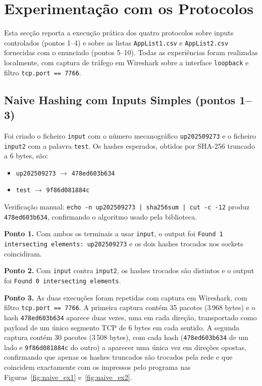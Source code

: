\clearpage
\section{Experimentação com os Protocolos}
\label{sec:step2}

Esta secção reporta a execução prática dos quatro protocolos sobre inputs controlados (pontos 1--4) e sobre as listas \texttt{AppList1.csv} e \texttt{AppList2.csv} fornecidas com o enunciado (pontos 5--10). Todas as experiências foram realizadas localmente, com captura de tráfego em Wireshark sobre a interface \texttt{loopback} e filtro \texttt{tcp.port == 7766}.

\subsection{Naive Hashing com Inputs Simples (pontos 1--3)}
\label{sec:naive_simples}

Foi criado o ficheiro \texttt{input} com o número mecanográfico \texttt{up202509273} e o ficheiro \texttt{input2} com a palavra \texttt{test}. Os hashes esperados, obtidos por SHA-256 truncado a 6 bytes, são:

\begin{itemize}
  \item \texttt{up202509273} $\rightarrow$ \texttt{478ed603b634}
  \item \texttt{test} $\rightarrow$ \texttt{9f86d081884c}
\end{itemize}

Verificação manual: \texttt{echo -n up202509273 | sha256sum | cut -c -12} produz \texttt{478ed603b634}, confirmando o algoritmo usado pela biblioteca.

\textbf{Ponto 1.} Com ambos os terminais a usar \texttt{input}, o output foi \texttt{Found 1 intersecting elements: up202509273} e os dois hashes trocados nos sockets coincidiram.

\textbf{Ponto 2.} Com \texttt{input} contra \texttt{input2}, os hashes trocados são distintos e o output foi \texttt{Found 0 intersecting elements}.

\textbf{Ponto 3.} As duas execuções foram repetidas com captura em Wireshark, com filtro \texttt{tcp.port == 7766}. A primeira captura contém 35 pacotes (3\,968 bytes) e o hash \texttt{478ed603b634} aparece duas vezes, uma em cada direção, transportado como payload de um único segmento TCP de 6 bytes em cada sentido. A segunda captura contém 30 pacotes (3\,508 bytes), com cada hash (\texttt{478ed603b634} de um lado e \texttt{9f86d081884c} do outro) a aparecer uma única vez em direções opostas, confirmando que apenas os hashes truncados são trocados pela rede e que coincidem exactamente com os impressos pelo programa nas Figuras~\ref{fig:naive_ex1} e~\ref{fig:naive_ex2}.

